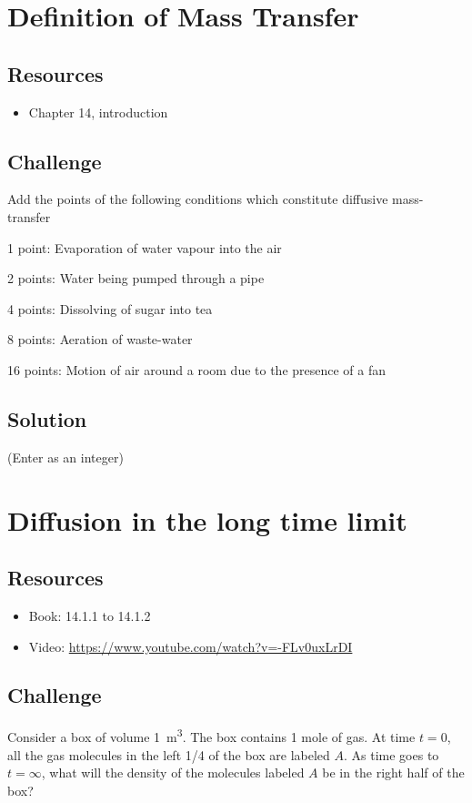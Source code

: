 \newpage
\section{Definition of Mass Transfer}

\subsection*{Resources}
\begin{itemize}
    \item Chapter 14, introduction
\end{itemize}

\subsection*{Challenge}
Add the points of the following conditions which constitute diffusive mass-transfer

1 point: Evaporation of water vapour into the air

2 points: Water being pumped through a pipe

4 points: Dissolving of sugar into tea

8 points: Aeration of waste-water

16 points: Motion of air around a room due to the presence of a fan

\subsection*{Solution}
(Enter as an integer)





\newpage
\section{Diffusion in the long time limit}

\subsection*{Resources}
\begin{itemize}
    \item Book: 14.1.1 to 14.1.2
    \item Video: \url{https://www.youtube.com/watch?v=-FLv0uxLrDI}
\end{itemize}

\subsection*{Challenge}
Consider a box of volume \SI{1}{\cubic\meter}. The box contains 1 mole of gas. At time $t=0$, all the gas molecules in the left 1/4 of the box are labeled $A$. As time goes to $t=\infty$, what will the density of the molecules labeled $A$ be in the right half of the box?

